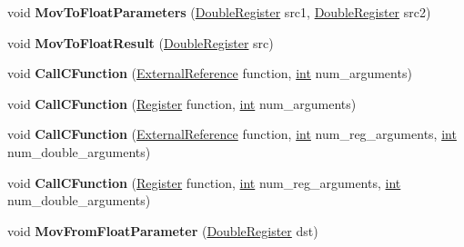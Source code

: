 \begin{DoxyCompactItemize}
void {\bfseries Mov\+To\+Float\+Parameters} (\mbox{\hyperlink{classv8_1_1internal_1_1DoubleRegister}{Double\+Register}} src1, \mbox{\hyperlink{classv8_1_1internal_1_1DoubleRegister}{Double\+Register}} src2)
\item 
\mbox{\label{classv8_1_1internal_1_1TurboAssembler_a0a80563e5b6000c3b0b135eea184ed52}} 
void {\bfseries Mov\+To\+Float\+Result} (\mbox{\hyperlink{classv8_1_1internal_1_1DoubleRegister}{Double\+Register}} src)
\item 
\mbox{\label{classv8_1_1internal_1_1TurboAssembler_a46885d6523759af24eb058d5d8d39d44}} 
void {\bfseries Call\+C\+Function} (\mbox{\hyperlink{classv8_1_1internal_1_1ExternalReference}{External\+Reference}} function, \mbox{\hyperlink{classint}{int}} num\+\_\+arguments)
\item 
\mbox{\label{classv8_1_1internal_1_1TurboAssembler_a09dacf4e0be8170e3cbd4a489778633e}} 
void {\bfseries Call\+C\+Function} (\mbox{\hyperlink{classv8_1_1internal_1_1Register}{Register}} function, \mbox{\hyperlink{classint}{int}} num\+\_\+arguments)
\item 
\mbox{\label{classv8_1_1internal_1_1TurboAssembler_abdafca48f4971e28009f86e4ff25de15}} 
void {\bfseries Call\+C\+Function} (\mbox{\hyperlink{classv8_1_1internal_1_1ExternalReference}{External\+Reference}} function, \mbox{\hyperlink{classint}{int}} num\+\_\+reg\+\_\+arguments, \mbox{\hyperlink{classint}{int}} num\+\_\+double\+\_\+arguments)
\item 
\mbox{\label{classv8_1_1internal_1_1TurboAssembler_ac47afd32db8e770d2803e3f116c30e60}} 
void {\bfseries Call\+C\+Function} (\mbox{\hyperlink{classv8_1_1internal_1_1Register}{Register}} function, \mbox{\hyperlink{classint}{int}} num\+\_\+reg\+\_\+arguments, \mbox{\hyperlink{classint}{int}} num\+\_\+double\+\_\+arguments)
\item 
\mbox{\label{classv8_1_1internal_1_1TurboAssembler_a3ef3e6f02594d358e3385eac66ceab18}} 
void {\bfseries Mov\+From\+Float\+Parameter} (\mbox{\hyperlink{classv8_1_1internal_1_1DoubleRegister}{Double\+Register}} dst)

\end{DoxyCompactItemize}
